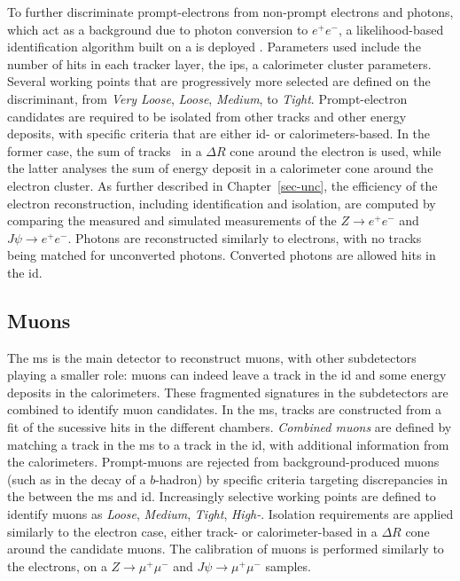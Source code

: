 To further discriminate prompt-electrons from non-prompt electrons and photons, which act as a background due to photon conversion to $e^+e^-$, a likelihood-based identification algorithm built on a  is deployed \cite{Aaboud:2657964}. Parameters used include the number of hits in each tracker layer, the \glspl{ip}, a calorimeter cluster parameters. Several working points that are progressively more selected are defined on the discriminant, from \textit{Very Loose}, \textit{Loose}, \textit{Medium}, to \textit{Tight}. Prompt-electron candidates are required to be isolated from other tracks and other energy deposits, with specific criteria that are either \gls{id}- or calorimeters-based. In the former case, the sum of tracks \pt\ in a $\Delta R$ cone around the electron is used, while the latter analyses the sum of energy deposit in a calorimeter cone around the electron cluster. As further described in Chapter~\ref{sec-unc}, the efficiency of the electron reconstruction, including identification and isolation, are computed by comparing the measured and simulated measurements of the $Z\rightarrow e^+e^-$ and $J\psi\rightarrow e^+e^-$. Photons are reconstructed similarly to electrons, with no tracks being matched for unconverted photons. Converted photons are allowed hits in the \gls{id}. 

\subsection{Muons}
The \gls{ms} is the main detector to reconstruct muons, with other subdetectors playing a smaller role: muons can indeed leave a track in the \gls{id} and some energy deposits in the calorimeters. These fragmented signatures in the subdetectors are combined to identify muon candidates. In the \gls{ms}, tracks are constructed from a fit of the sucessive hits in the different chambers. \textit{Combined muons} are defined by matching a track in the \gls{ms} to a track in the \gls{id}, with additional information from the calorimeters. Prompt-muons are rejected from background-produced muons (such as in the decay of a $b$-hadron) by specific criteria targeting discrepancies in the \pt between the \gls{ms} and \gls{id}. Increasingly selective working points are defined to identify muons as \textit{Loose}, \textit{Medium}, \textit{Tight}, \textit{High-\pt}. Isolation requirements are applied similarly to the electron case, either track- or calorimeter-based in a $\Delta R$ cone around the candidate muons. The calibration of muons is performed similarly to the electrons, on a $Z\rightarrow \mu^+\mu^-$ and $J\psi\rightarrow \mu^+\mu^-$ samples.

